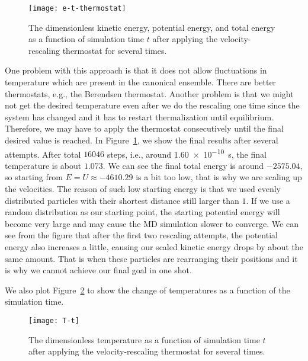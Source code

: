 \begin{figure}[H]
    \centering
    \texttt{[image: e-t-thermostat]}
    \caption{The dimensionless kinetic energy, potential energy, and total energy
        as a function of simulation time \(t\) after applying the velocity-rescaling
        thermostat for several times.}
    \label{fig:md-thermostat}
\end{figure}

One problem with this approach is that it does not
allow fluctuations in temperature which are present in the canonical ensemble.
There are better thermostats, e.g., the Berendsen thermostat.
Another problem is that we might not get the desired temperature even after we do the
rescaling one time since the system has changed and it has to restart thermalization
until equilibrium. Therefore, we may have to apply the thermostat consecutively
until the final desired value is reached.
In Figure~\ref{fig:md-thermostat}, we show the final results after several attempts.
After total \(16046\) steps, i.e., around \qty{1.60e-10}{\second}, the final temperature is
about \(1.073\).
We can see the final total energy is around \(-2575.04\), so starting from
\(E = U \approx -4610.29\) is a bit too low, that is why we are scaling up the velocities.
The reason of such low starting energy is that we used evenly distributed particles
with their shortest distance still larger than \(1\). If we use a random distribution
as our starting point, the starting potential energy will become very large and
may cause the MD simulation slower to converge.
We can see from the figure that after the first two rescaling attempts, the potential
energy also increases a little, causing our scaled kinetic energy drops by about the
same amount. That is when these particles are rearranging their positions and
it is why we cannot achieve our final goal in one shot.

We also plot Figure~\ref{fig:T-t} to show the change of temperatures as a function
of the simulation time.

\begin{figure}
    \centering
    \texttt{[image: T-t]}
    \caption{The dimensionless temperature as a function of simulation time \(t\) after
        applying the velocity-rescaling thermostat for several times.}
    \label{fig:T-t}
\end{figure}
